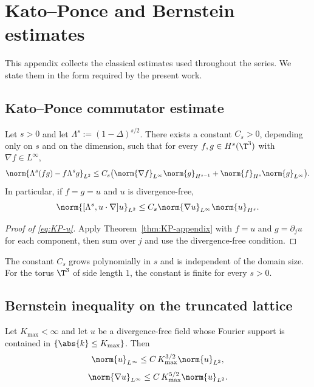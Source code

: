 \section{Kato--Ponce and Bernstein estimates}
\label{app:A}

This appendix collects the classical estimates used throughout the 
series. We state them in the form required by the present work.

\subsection{Kato--Ponce commutator estimate}
\label{ssec:KP}

\begin{theorem}\label{thm:KP-appendix}
Let $s>0$ and let $\Lambda^s := (1-\Delta)^{s/2}$. There exists a 
constant $C_s>0$, depending only on $s$ and on the dimension, such 
that for every $f,g\in H^s(\T^3)$ with $\nabla f\in L^\infty$,
\begin{equation}\label{eq:KP-appendix}
\norm{\Lambda^s(fg) - f\Lambda^s g}_{L^2} 
\leq C_s\bigl(\norm{\nabla f}_{L^\infty}\norm{g}_{H^{s-1}} 
+ \norm{f}_{H^s}\norm{g}_{L^\infty}\bigr).
\end{equation}
In particular, if $f = g = u$ and $u$ is divergence-free,
\begin{equation}\label{eq:KP-u}
\norm{[\Lambda^s, u\cdot\nabla]u}_{L^2} 
\leq C_s\norm{\nabla u}_{L^\infty}\norm{u}_{H^s}.
\end{equation}
\end{theorem}

\begin{proof}[Proof of \eqref{eq:KP-u}]
Apply Theorem~\ref{thm:KP-appendix} with $f = u$ and $g = 
\partial_j u$ for each component, then sum over $j$ and use the 
divergence-free condition.
\end{proof}

\begin{remark}[Constant $C_s$]\label{rem:C_s}
The constant $C_s$ grows polynomially in $s$ and is independent of 
the domain size. For the torus $\T^3$ of side length $1$, the 
constant is finite for every $s>0$.
\end{remark}

\subsection{Bernstein inequality on the truncated lattice}
\label{ssec:Bernstein}

\begin{lemma}[Bernstein]\label{lem:Bernstein}
Let $K_{\max}<\infty$ and let $u$ be a divergence-free field whose 
Fourier support is contained in $\{\abs{k}\leq K_{\max}\}$. Then
\begin{equation}\label{eq:Bernstein}
\norm{u}_{L^\infty}\leq C\,K_{\max}^{3/2}\norm{u}_{L^2},
\end{equation}
\begin{equation}\label{eq:Bernstein-2}
\norm{\nabla u}_{L^\infty}\leq C\,K_{\max}^{5/2}\norm{u}_{L^2}.
\end{equation}
\end{lemma}

